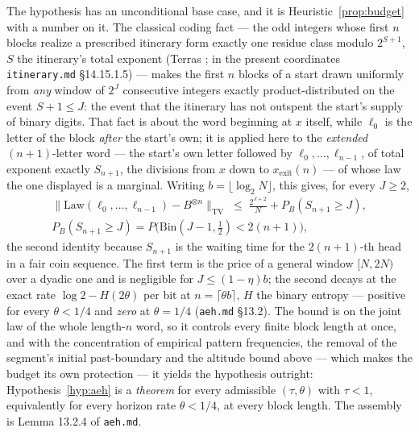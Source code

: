 \documentclass[11pt]{article}
\theoremstyle{remark}
\begin{document}
The hypothesis has an unconditional base case, and it is Heuristic~\ref{prop:budget}
with a number on it. The classical coding fact --- the odd integers whose first $n$
blocks realize a prescribed itinerary form exactly one residue class modulo
$2^{S+1}$, $S$ the itinerary's total exponent (Terras \cite{terras}; in the present
coordinates \texttt{itinerary.md} \S14.15.1.5) --- makes the first $n$ blocks of a
start drawn uniformly from \emph{any} window of $2^{J}$ consecutive integers
exactly product-distributed on the event $S + 1 \le J$: the event that the itinerary
has not outspent the start's supply of binary digits. That fact is about the word
beginning at $x$ itself, while $\ell_0$ is the letter of the block \emph{after} the
start's own; it is applied here to the \emph{extended} $(n+1)$-letter word --- the
start's own letter followed by $\ell_0,\dots,\ell_{n-1}$, of total exponent exactly
$S_{n+1}$, the divisions from $x$ down to $x_{\mathrm{exit}}(n)$ --- of whose law
the one displayed is a marginal. Writing
$b = \lfloor\log_2 N\rfloor$, this gives, for every $J \ge 2$,
\[
  \begin{gathered}
    \bigl\lVert \mathrm{Law}(\ell_0,\dots,\ell_{n-1}) - B^{\otimes n}
      \bigr\rVert_{\mathrm{TV}}
    \;\le\; \frac{2^{J+2}}{N} + P_B(S_{n+1} \ge J), \\[2pt]
    P_B(S_{n+1} \ge J) = P\bigl(\mathrm{Bin}(J-1,\tfrac12) < 2(n+1)\bigr),
  \end{gathered}
\]
the second identity because $S_{n+1}$ is the waiting time for the $2(n+1)$-th
head in a fair coin sequence. The first term is the price of a general window
$[N,2N)$ over a dyadic one and is negligible for $J \le (1-\eta)b$; the second
decays at the exact rate $\log 2 - H(2\theta)$ per bit at $n = \lceil\theta b\rceil$,
$H$ the binary entropy --- positive for every $\theta < 1/4$ and \emph{zero} at
$\theta = 1/4$ (\texttt{aeh.md} \S13.2). The bound is on the joint law of the whole
length-$n$ word, so it controls every finite block length at once, and with the
concentration of empirical pattern frequencies, the removal of the segment's initial
past-boundary and the altitude bound above --- which makes the budget its own
protection --- it yields the hypothesis outright:
Hypothesis~\ref{hyp:aeh} is a \emph{theorem} for every admissible $(\tau,\theta)$
with $\tau < 1$, equivalently for every horizon rate $\theta < 1/4$, at every
block length. The assembly is Lemma 13.2.4 of \texttt{aeh.md}.
\end{document}
